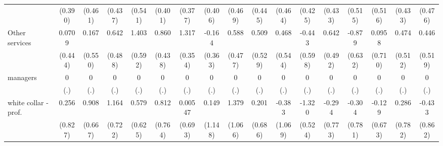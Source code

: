 {\begin{tabular}{l*{16}{c}}
                    &     (0.390)         &     (0.461)         &     (0.437)         &     (0.541)         &     (0.401)         &     (0.377)         &     (0.406)         &     (0.469)         &     (0.445)         &     (0.464)         &     (0.425)         &     (0.433)         &     (0.515)         &     (0.516)         &     (0.433)         &     (0.476)         \\
[1em]
Other services      &      0.0709         &       0.167         &       0.642         &       1.403\sym{*}  &       0.860\sym{*}  &       1.317\sym{***}&      -0.164         &       0.588         &       0.509         &       0.468         &      -0.443         &       0.642         &      -0.879         &      0.0958         &       0.474         &       0.446         \\
                    &     (0.444)         &     (0.550)         &     (0.488)         &     (0.592)         &     (0.438)         &     (0.354)         &     (0.363)         &     (0.477)         &     (0.529)         &     (0.544)         &     (0.598)         &     (0.492)         &     (0.632)         &     (0.710)         &     (0.512)         &     (0.519)         \\
[1em]
managers            &           0         &           0         &           0         &           0         &           0         &           0         &           0         &           0         &           0         &           0         &           0         &           0         &           0         &           0         &           0         &           0         \\
                    &         (.)         &         (.)         &         (.)         &         (.)         &         (.)         &         (.)         &         (.)         &         (.)         &         (.)         &         (.)         &         (.)         &         (.)         &         (.)         &         (.)         &         (.)         &         (.)         \\
[1em]
white collar - prof.&       0.256         &       0.908         &       1.164         &       0.579         &       0.812         &     0.00547         &       0.149         &       1.379         &       0.201         &      -0.383         &      -1.320\sym{*}  &      -0.294         &      -0.304         &      -0.129         &       0.286         &      -0.433         \\
                    &     (0.827)         &     (0.667)         &     (0.722)         &     (0.625)         &     (0.764)         &     (0.693)         &     (1.148)         &     (1.066)         &     (0.686)         &     (1.069)         &     (0.524)         &     (0.773)         &     (0.781)         &     (0.673)         &     (0.782)         &     (0.862)         \\

\end{tabular}}
